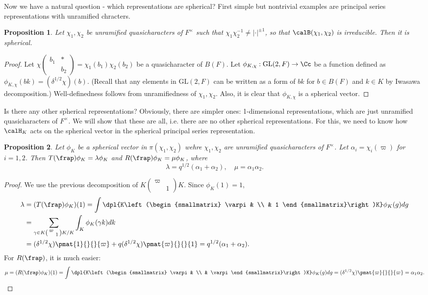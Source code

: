 \documentclass{article}
\newcommand{\GL}{\mathrm{GL}}
\newcommand{\smat}[4]{\left(\begin{smallmatrix} #1 & #2 \\ #3 & #4 \end{smallmatrix}\right)}
\newtheorem{proposition}{Proposition}[section]
\begin{document}
Now we have a natural question - which representations are spherical? 
First simple but nontrivial examples are principal series representations with unramified chracters. 
\begin{proposition}
Let $\chi_1, \chi_2$ be unramified quasicharacters of $F^{\times}$ such that $\chi_{1}\chi_{2}^{-1}\neq |\cdot|^{\pm 1}$, so that $\calB(\chi_1, \chi_2)$ is irreducible. 
Then it is spherical. 
\end{proposition}
\begin{proof}
Let $\chi\smat{b_{1}}{*}{}{b_{2}} = \chi_{1}(b_{1})\chi_{2}(b_{2})$ be a quasicharacter of $B(F)$. 
Let $\phi_{K, \chi}:\GL(2, F)\to \Cc$ be a function defined as $\phi_{K, \chi}(bk) = (\delta^{1/2}\chi)(b)$. (Recall that any elements in $\GL(2, F)$ can be written as a form of $bk$ for $b\in B(F)$ and $k\in K$ by Iwasawa decomposition.)
Well-definedness follows from unramifiedness of $\chi_1, \chi_2$. 
Also, it is clear that $\phi_{K, \chi}$ is a spherical vector. 
\end{proof}
Is there any other spherical representations? Obviously, there are simpler ones: 1-dimensional representations, which are just unramified quasicharacters of $F^{\times}$. 
We will show that these are all, i.e. there are no other spherical representations. 
For this, we need to know how $\calH_K$ acts on the spherical vector in the spherical principal series representation. 
\begin{proposition}
Let $\phi_K$ be a spherical vector in $\pi(\chi_1, \chi_2)$ wehre $\chi_1, \chi_2$ are unramified quasicharacters of $F^{\times}$. 
Let $\alpha_i = \chi_i(\varpi)$ for $i = 1, 2$. 
Then $T(\frap)\phi_K = \lambda \phi_K$ and $R(\frap)\phi_K = \mu \phi_K$, where
$$
\lambda = q^{1/2}(\alpha_1 + \alpha_2), \quad \mu = \alpha_1 \alpha_2.
$$
\end{proposition}
\begin{proof}
We use the previous decomposition of $K\smat{\varpi}{}{}{1}K$. Since $\phi_K(1) = 1$, 
\begin{align*}
\lambda &= (T(\frap)\phi_K)(1) = \int\dpl{K\smat{\varpi}{}{}{1}K} \phi_{K}(g)dg \\
&= \sum_{\gamma\in K\smat{\varpi}{}{}{1}K/K} \int_K \phi_K(\gamma k)dk \\
&= (\delta^{1/2}\chi)\pmat{1}{}{}{\varpi} + q(\delta^{1/2}\chi)\pmat{\varpi}{}{}{1} = q^{1/2}(\alpha_1 + \alpha_2). 
\end{align*}
For $R(\frap)$, it is much easier:
$$
\mu = (R(\frap)\phi_K)(1) = \int\dpl{K\smat{\varpi}{}{}{\varpi}K} \phi_K(g)dg = (\delta^{1/2}\chi)\pmat{\varpi}{}{}{\varpi} = \alpha_1 \alpha_2. 
$$
\end{proof}
\end{document}
